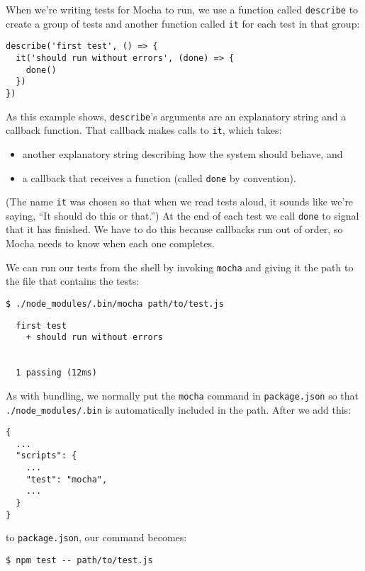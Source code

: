 When we're writing tests for Mocha to run,
we use a function called \texttt{describe} to create a group of tests
and another function called \texttt{it} for each test in that group:

\begin{verbatim}
describe('first test', () => {
  it('should run without errors', (done) => {
    done()
  })
})
\end{verbatim}

As this example shows,
\texttt{describe}'s arguments are an explanatory string and a callback function.
That callback makes calls to \texttt{it}, which takes:

\begin{itemize}
\item
  another explanatory string describing how the system should behave, and
\item
  a callback that receives a function (called \texttt{done} by convention).
\end{itemize}

(The name \texttt{it} was chosen so that when we read tests aloud,
it sounds like we're saying, ``It should do this or that.'')
At the end of each test we call \texttt{done} to signal that it has finished.
We have to do this because callbacks run out of order,
so Mocha needs to know when each one completes.

We can run our tests from the shell by invoking \texttt{mocha}
and giving it the path to the file that contains the tests:

\begin{verbatim}
$ ./node_modules/.bin/mocha path/to/test.js
\end{verbatim}

\begin{verbatim}
  first test
    + should run without errors


  1 passing (12ms)
\end{verbatim}

As with bundling,
we normally put the \texttt{mocha} command in \texttt{package.json}
so that \texttt{./node\_modules/.bin} is automatically included in the path.
After we add this:

\begin{verbatim}
{
  ...
  "scripts": {
    ...
    "test": "mocha",
    ...
  }
}
\end{verbatim}

\noindent
to \texttt{package.json}, our command becomes:

\begin{verbatim}
$ npm test -- path/to/test.js
\end{verbatim}

